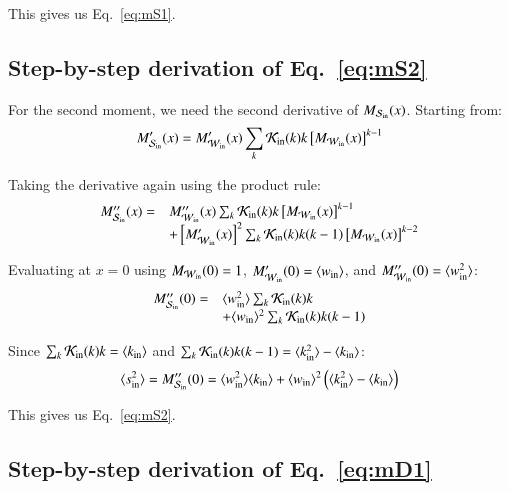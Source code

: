 \documentclass[a4paper,pre,superscriptaddress,floatfix,nofootinbib,twocolumn]{revtex4-1}
\begin{document}
This gives us Eq.~\eqref{eq:mS1}.

\subsection*{Step-by-step derivation of Eq.~\eqref{eq:mS2}}

For the second moment, we need the second derivative of $M_{{\cal S}_\text{in}}(x)$. Starting from:
\[
M'_{{\cal S}_\text{in}}(x) = M'_{{\cal W}_\text{in}}(x) \sum_{k} {\cal K}_\text{in}(k) k \left[ M_{{\cal W}_\text{in}}(x) \right]^{k-1}
\]

Taking the derivative again using the product rule:
\[
\begin{array}{ll}
M''_{{\cal S}_\text{in}}(x) = & M''_{{\cal W}_\text{in}}(x) \sum_{k} {\cal K}_\text{in}(k) k \left[ M_{{\cal W}_\text{in}}(x) \right]^{k-1} \\
& + \left[M'_{{\cal W}_\text{in}}(x)\right]^2 \sum_{k} {\cal K}_\text{in}(k) k(k-1) \left[ M_{{\cal W}_\text{in}}(x) \right]^{k-2}
\end{array}
\]


Evaluating at $x = 0$ using $M_{{\cal W}_\text{in}}(0) = 1$, $M'_{{\cal W}_\text{in}}(0) = \langle w_\text{in} \rangle$, and $M''_{{\cal W}_\text{in}}(0) = \langle w^2_\text{in} \rangle$:
\[
\begin{array}{ll}
M''_{{\cal S}_\text{in}}(0) = & \langle w^2_\text{in} \rangle \sum_{k} {\cal K}_\text{in}(k) k \\
& + \langle w_\text{in} \rangle^2 \sum_{k} {\cal K}_\text{in}(k) k(k-1)
\end{array}
\]

Since $\sum_{k} {\cal K}_\text{in}(k) k = \langle k_{\text{in}} \rangle$ and $\sum_{k} {\cal K}_\text{in}(k) k(k-1) = \langle k^2_{\text{in}} \rangle - \langle k_{\text{in}} \rangle$:
\[
\langle s^2_\text{in} \rangle = M''_{{\cal S}_\text{in}}(0) = \langle w^2_\text{in} \rangle \langle k_{\text{in}} \rangle + \langle w_\text{in} \rangle^2 \left( \langle k^2_{\text{in}} \rangle - \langle k_{\text{in}} \rangle \right)
\]

This gives us Eq.~\eqref{eq:mS2}.

\subsection*{Step-by-step derivation of Eq.~\eqref{eq:mD1}}
\end{document}
